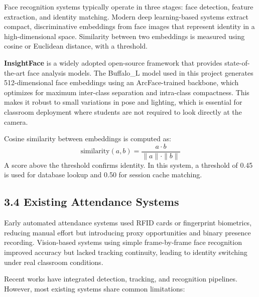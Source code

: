\documentclass{report}
\begin{document}
Face recognition systems typically operate in three stages: face detection, feature extraction, and\vspace{3pt} identity matching. Modern deep learning-based systems extract compact, discriminative embeddings\vspace{3pt} from face images that represent identity in a high-dimensional space. Similarity between two embeddings\vspace{3pt} is measured using cosine or Euclidean distance, with a threshold.

\textbf{InsightFace} is a widely adopted open-source framework that provides state-of-the-art face analysis\vspace{3pt} models. The Buffalo\_L model used in this project generates 512-dimensional face embeddings using\vspace{3pt} an ArcFace-trained backbone, which optimizes for maximum inter-class separation and intra-class\vspace{3pt} compactness. This makes it robust to small variations in pose and lighting, which is essential for\vspace{3pt} classroom deployment where students are not required to look directly at the camera.

Cosine similarity between embeddings is computed as:
\begin{equation}
    \text{similarity}(a, b) = \frac{a \cdot b}{\|a\| \cdot \|b\|}
\end{equation}
A score above the threshold confirms identity. In this system, a threshold of 0.45 is used for\vspace{3pt} database lookup and 0.50 for session cache matching.

\subsection*{3.4 Existing Attendance Systems}

Early automated attendance systems used RFID cards or fingerprint biometrics, reducing manual effort\vspace{3pt} but introducing proxy opportunities and binary presence recording. Vision-based systems using\vspace{3pt} simple frame-by-frame face recognition improved accuracy but lacked tracking continuity, leading to\vspace{3pt} identity switching under real classroom conditions.

Recent works have integrated detection, tracking, and recognition pipelines. However, most existing\vspace{3pt} systems share common limitations:
\end{document}
